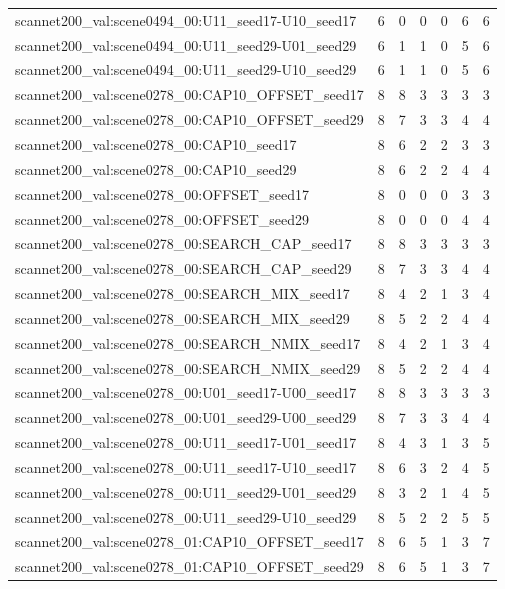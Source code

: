 \begin{table}[t]
\begin{tabular}{lrrrrrr}
scannet200\_val:scene0494\_00:U11\_seed17-U10\_seed17 & 6 & 0 & 0 & 0 & 6 & 6 \\
scannet200\_val:scene0494\_00:U11\_seed29-U01\_seed29 & 6 & 1 & 1 & 0 & 5 & 6 \\
scannet200\_val:scene0494\_00:U11\_seed29-U10\_seed29 & 6 & 1 & 1 & 0 & 5 & 6 \\
scannet200\_val:scene0278\_00:CAP10\_OFFSET\_seed17 & 8 & 8 & 3 & 3 & 3 & 3 \\
scannet200\_val:scene0278\_00:CAP10\_OFFSET\_seed29 & 8 & 7 & 3 & 3 & 4 & 4 \\
scannet200\_val:scene0278\_00:CAP10\_seed17 & 8 & 6 & 2 & 2 & 3 & 3 \\
scannet200\_val:scene0278\_00:CAP10\_seed29 & 8 & 6 & 2 & 2 & 4 & 4 \\
scannet200\_val:scene0278\_00:OFFSET\_seed17 & 8 & 0 & 0 & 0 & 3 & 3 \\
scannet200\_val:scene0278\_00:OFFSET\_seed29 & 8 & 0 & 0 & 0 & 4 & 4 \\
scannet200\_val:scene0278\_00:SEARCH\_CAP\_seed17 & 8 & 8 & 3 & 3 & 3 & 3 \\
scannet200\_val:scene0278\_00:SEARCH\_CAP\_seed29 & 8 & 7 & 3 & 3 & 4 & 4 \\
scannet200\_val:scene0278\_00:SEARCH\_MIX\_seed17 & 8 & 4 & 2 & 1 & 3 & 4 \\
scannet200\_val:scene0278\_00:SEARCH\_MIX\_seed29 & 8 & 5 & 2 & 2 & 4 & 4 \\
scannet200\_val:scene0278\_00:SEARCH\_NMIX\_seed17 & 8 & 4 & 2 & 1 & 3 & 4 \\
scannet200\_val:scene0278\_00:SEARCH\_NMIX\_seed29 & 8 & 5 & 2 & 2 & 4 & 4 \\
scannet200\_val:scene0278\_00:U01\_seed17-U00\_seed17 & 8 & 8 & 3 & 3 & 3 & 3 \\
scannet200\_val:scene0278\_00:U01\_seed29-U00\_seed29 & 8 & 7 & 3 & 3 & 4 & 4 \\
scannet200\_val:scene0278\_00:U11\_seed17-U01\_seed17 & 8 & 4 & 3 & 1 & 3 & 5 \\
scannet200\_val:scene0278\_00:U11\_seed17-U10\_seed17 & 8 & 6 & 3 & 2 & 4 & 5 \\
scannet200\_val:scene0278\_00:U11\_seed29-U01\_seed29 & 8 & 3 & 2 & 1 & 4 & 5 \\
scannet200\_val:scene0278\_00:U11\_seed29-U10\_seed29 & 8 & 5 & 2 & 2 & 5 & 5 \\
scannet200\_val:scene0278\_01:CAP10\_OFFSET\_seed17 & 8 & 6 & 5 & 1 & 3 & 7 \\
scannet200\_val:scene0278\_01:CAP10\_OFFSET\_seed29 & 8 & 6 & 5 & 1 & 3 & 7 \\

\end{tabular}
\end{table}
